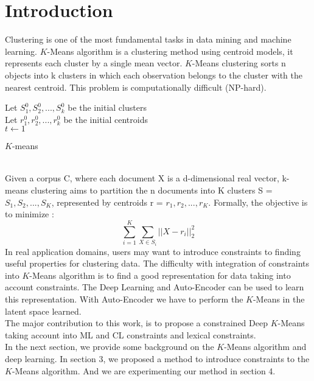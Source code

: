 \section{Introduction}\label{sec:intro}

Clustering is one of the most fundamental tasks in data mining and machine
learning. $K$-Means algorithm is a clustering method using centroid models,
it represents each cluster by a single mean vector. $K$-Means clustering sorts
n objects into k clusters in which each observation belongs to
the cluster with the nearest centroid. This problem is computationally
difficult (NP-hard).
\begin{algorithm}
  Let $S_1^{0}, S_2^{0} , ..., S_k^{0}$ be the initial clusters\\
  Let $r_1^{0}, r_2^{0} , ..., r_k^{0}$ be the initial centroids\\
  $t \gets 1$\\
  \caption{$K$-means}
\end{algorithm}
\\Given a corpus C, where each document X is a 
d-dimensional real vector, k-means clustering aims to partition the n 
documents into K clusters S = {$S_1, S_2, ..., S_K$}, represented by centroids 
r = {$r_1, r_2, ..., r_K$}. Formally, the objective is to minimize :
$$
\sum_{i=1}^K \sum_{X \in S_i} ||X - r_i ||_2^2
$$
In real application domains, users may want to introduce constraints to finding 
useful properties for clustering data. The difficulty with integration of 
constraints into $K$-Means algorithm is to find a good representation for data 
taking into account constraints. The Deep Learning and Auto-Encoder can be used 
to learn this representation. With Auto-Encoder we have to perform the $K$-Means 
in the latent space learned.
\\The major contribution to this work, is to propose a constrained Deep $K$-Means 
taking account into ML and CL constraints and lexical constraints.
\\In the next section, we provide some background on the $K$-Means algorithm and 
deep learning. In section 3, we proposed a method to introduce constraints to 
the $K$-Means algorithm. And we are experimenting our method in section 4.